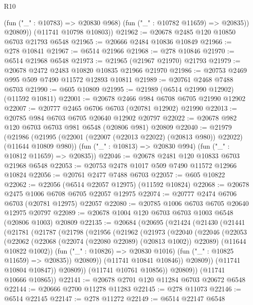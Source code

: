 \begin{lexlean}{R10}
\begin{coremodule}
            (fun ("_" : @10783) => @20830 @968)
            (fun ("_" : @10782 @11659) => @20835))
          @20809))
      (@11741 @10798 @10803))
@21962 := @20678 @2485 @120 @10850 @6703 @21793 @6548
@21965 := @20666 @2484 @10836 @10849
@21966 := @278 @10841
@21967 := @6514 @21966
@21968 := @278 @10846
@21970 := @6514 @21968 @6548
@21973 := @21965 (@21967 @21970) @21793
@21979 := @20678 @2472 @2483 @10820 @10835 @21966 @21970
@21986 := @20753 @2469 @995 @509 @7490 @11572 @12893 @10811
@21989 := @20761 @2468 @7488 @6703
@21990 := @605 @10809
@21995 := @21989 (@6514 @21990 @12902) (@11592 @10811)
@22001 := @20678 @2466 @984 @6708 @6705 @21990 @12902
@22007 := @20777 @2465 @6706 @6703 (@20781 @12902) @21990
@22013 := @20785 @984 @6703 @6705 @20640 @12902 @20797
@22022 := @20678 @982 @120 @6703 @6703 @981 @6548 (@20806 @981) @20809
@22040 := @21979
    (@21986
      (@21995 (@22001 (@22007 (@22013 @22022) (@20813 @980)) @22022) (@11644 @10809 @980))
      (fun ("_" : @10813) => @20830 @994)
      (fun ("_" : @10812 @11659) => @20835))
@22046 := @20678 @2481 @120 @10833 @6703 @21968 @6548
@22053 := @20753 @2478 @1017 @509 @7490 @11572 @12966 @10824
@22056 := @20761 @2477 @7488 @6703
@22057 := @605 @10822
@22062 := @22056 (@6514 @22057 @12975) (@11592 @10824)
@22068 := @20678 @2475 @1006 @6708 @6705 @22057 @12975
@22074 := @20777 @2474 @6706 @6703 (@20781 @12975) @22057
@22080 := @20785 @1006 @6703 @6705 @20640 @12975 @20797
@22089 := @20678 @1004 @120 @6703 @6703 @1003 @6548 (@20806 @1003) @20809
@22135 := @20684
    (@20695
      (@21424
        (@21430
          (@21441
            (@21781
              (@21787
                (@21798
                  (@21956
                    (@21962
                      (@21973
                        (@22040
                          (@22046
                            (@22053
                              (@22062
                                (@22068 (@22074 (@22080 @22089) (@20813 @1002)) @22089)
                                (@11644 @10822 @1002))
                              (fun ("_" : @10826) => @20830 @1016)
                              (fun ("_" : @10825 @11659) => @20835))
                            @20809))
                        (@11741 @10841 @10846))
                      @20809))
                  (@11741 @10804 @10847))
                @20809))
            (@11741 @10761 @10856))
          @20809))
      (@11741 @10666 @10865))
@22141 := @20678 @2701 @120 @11284 @6703 @20672 @6548
@22144 := @20666 @2700 @11278 @11283
@22145 := @278 @11073
@22146 := @6514 @22145
@22147 := @278 @11272
@22149 := @6514 @22147 @6548

\end{coremodule}
\end{lexlean}
